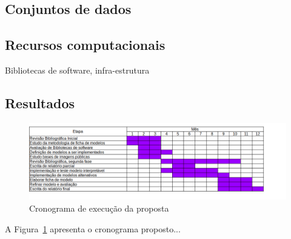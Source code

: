 \documentclass[12pt]{article}
\begin{document}
\subsection{Conjuntos de dados}
\label{sec:dados}


\subsection{Recursos computacionais}
\label{sec:recursos}

Bibliotecas de software, infra-estrutura


\subsection{Resultados} 
\label{sec:resultados}


\begin{figure}[htb]
 \centering
 \includegraphics[width=1.0\textwidth]{images/crono2022}
 \caption{Cronograma de execução da proposta}
 \label{fig:crono}
\end{figure}


A Figura~\ref{fig:crono} apresenta o cronograma proposto...


\end{document}
